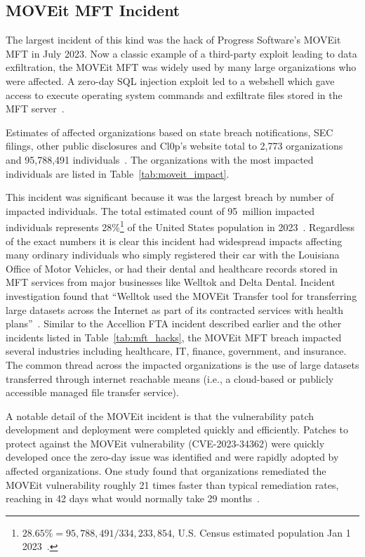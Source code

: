 \subsection{MOVEit MFT Incident}
\label{sec:moveit}

The largest incident of this kind was the hack of Progress Software's MOVEit MFT in July 2023. Now a classic example of a third-party exploit leading to data exfiltration, the MOVEit MFT was widely used by many large organizations who were affected. A zero-day SQL injection exploit led to a webshell which gave access to execute operating system commands and exfiltrate files stored in the MFT server~\cite{cisa_cl0p_2023}.

Estimates of affected organizations based on state breach notifications, SEC filings, other public disclosures and Cl0p's website total to 2{,}773 organizations and 95{,}788{,}491 individuals~\cite{simas_unpacking_2023,lyon_moveit}. The organizations with the most impacted individuals are listed in Table~\ref{tab:moveit_impact}.



This incident was significant because it was the largest breach by number of impacted individuals. The total estimated count of 95~million impacted individuals represents 28\%\footnote{$28.65\% = 95{,}788{,}491 / 334{,}233{,}854$, U.S. Census estimated population Jan 1 2023~\cite{us_census_2023}.} of the United States population in 2023~\cite{us_census_2023}. Regardless of the exact numbers it is clear this incident had widespread impacts affecting many ordinary individuals who simply registered their car with the Louisiana Office of Motor Vehicles, or had their dental and healthcare records stored in MFT services from major businesses like Welltok and Delta Dental. Incident investigation found that ``Welltok used the MOVEit Transfer tool for transferring large datasets across the Internet as part of its contracted services with health plans''~\cite{hipaa_welltok_2023}. Similar to the Accellion FTA incident described earlier and the other incidents listed in Table~\ref{tab:mft_hacks}, the MOVEit MFT breach impacted several industries including healthcare, IT, finance, government, and insurance. The common thread across the impacted organizations is the use of large datasets transferred through internet reachable means (i.e., a cloud-based or publicly accessible managed file transfer service).

A notable detail of the MOVEit incident is that the vulnerability patch development and deployment were completed quickly and efficiently. Patches to protect against the MOVEit vulnerability (CVE-2023-34362) were quickly developed once the zero-day issue was identified and were rapidly adopted by affected organizations. One study found that organizations remediated the MOVEit vulnerability roughly 21 times faster than typical remediation rates, reaching in 42 days what would normally take 29 months~\cite{bitsight_moveit_2023}.

